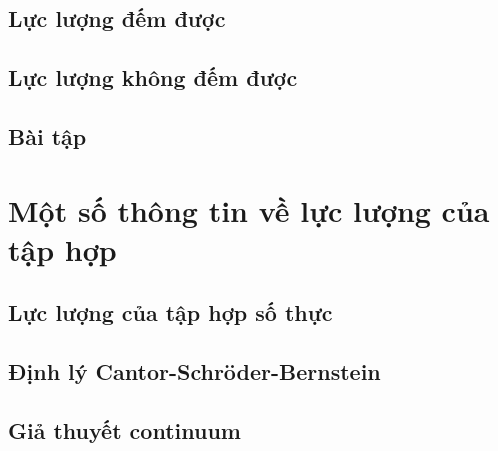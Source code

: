 \subsection{Lực lượng đếm được}

\subsection{Lực lượng không đếm được}

\subsection{Bài tập}

\section{Một số thông tin về lực lượng của tập hợp}

\subsection{Lực lượng của tập hợp số thực}

\subsection{Định lý Cantor-Schr\"{o}der-Bernstein}

\subsection{Giả thuyết continuum}
